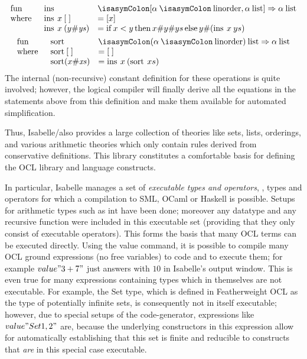 \begin{gather}\label{eq:sortdef}
  \begin{array}{lll}
    \fun
    &\enspace\operatorname{ins} & \ofType
    [\alpha\ofType\mathrm{linorder}, \HolList{\alpha}]
    \Rightarrow
    \HolList{\alpha}\\
    \where
    &\enspace \operatorname{ins}\ap x \ap  [\;] &= [x]\\
    &\enspace \operatorname{ins}\ap x \ap (y\#\mathit{ys})&=
    \HolIf x < y
    \HolThen x\#  y \# ys
    \HolElse y\#(\operatorname{ins} \ap x \ap ys)
 \end{array}\\
  \begin{array}{lll}
    \fun
    &\enspace\operatorname{sort} & \ofType
    \HolList{(\alpha\ofType\mathrm{linorder})}
    \Rightarrow
    \HolList{\alpha}\\
    \where
    &\enspace \operatorname{sort}\ap [\;] &= [\;]\\
    &\enspace \operatorname{sort} (x\#\mathit{xs})&=
    \operatorname{ins}\ap x\ap (\operatorname{sort}\ap xs)
   \end{array}
\end{gather}
The internal (non-recursive) constant definition for these operations
is quite involved; however, the logical compiler will finally derive
all the equations in the statements above from this definition and
make them available for automated simplification.

Thus, Isabelle/\HOL also provides a large collection of theories like
sets, lists, orderings, and various arithmetic theories
which only contain rules derived from conservative definitions. 
This library constitutes a comfortable basis for defining the OCL
library and language constructs.

In particular, Isabelle manages a set of \emph{executable types and
  operators}, \ie, types and operators for which a compilation to
SML, OCaml or Haskell is possible. Setups for arithmetic types
such as $\text{int}$ have been done; moreover any datatype and any
recursive function were included in this executable set (providing
that they only consist of executable operators). This forms the 
basis that many OCL terms can be executed directly.
Using the value command, it is possible to compile many OCL ground expressions
(no free variables) to code and to execute them; for example
\inlineisar$value "3 + 7"$ just answers with \inlineisar$10$ in Isabelle's 
output window. This is even true for many expressions containing types which
in themselves are not executable. For example, the Set type, which is 
defined in Featherweight OCL as the type of potentially infinite sets,
is consequently not in itself executable; however, due to special setups
of the code-generator, expressions like \inlineisar$value "Set{1,2}"$ are,
because the underlying constructors in this expression allow for automatically 
establishing that this set is finite and reducible to constructs that \emph{are}
in this special case executable.


